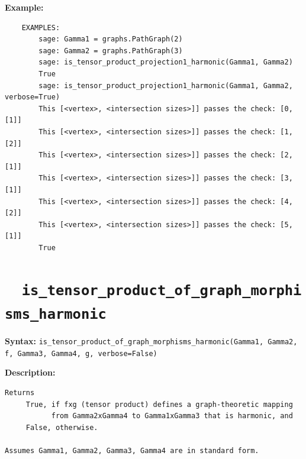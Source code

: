 \documentclass{article}
\begin{document}
\textbf{Example:}
\begin{verbatim}
    EXAMPLES:
        sage: Gamma1 = graphs.PathGraph(2)
        sage: Gamma2 = graphs.PathGraph(3)
        sage: is_tensor_product_projection1_harmonic(Gamma1, Gamma2) 
        True
        sage: is_tensor_product_projection1_harmonic(Gamma1, Gamma2, verbose=True) 
        This [<vertex>, <intersection sizes>]] passes the check: [0, [1]]
        This [<vertex>, <intersection sizes>]] passes the check: [1, [2]]
        This [<vertex>, <intersection sizes>]] passes the check: [2, [1]]
        This [<vertex>, <intersection sizes>]] passes the check: [3, [1]]
        This [<vertex>, <intersection sizes>]] passes the check: [4, [2]]
        This [<vertex>, <intersection sizes>]] passes the check: [5, [1]]
        True
\end{verbatim}

\section{\tt \ \ is\_tensor\_product\_of\_graph\_morphisms\_harmonic}

\textbf{Syntax:}
{\small{
\verb}is_tensor_product_of_graph_morphisms_harmonic(Gamma1, Gamma2, f, Gamma3, Gamma4, g, verbose=False)}\\
}}

\textbf{Description:}
\begin{verbatim}
Returns
     True, if fxg (tensor product) defines a graph-theoretic mapping
           from Gamma2xGamma4 to Gamma1xGamma3 that is harmonic, and
     False, otherwise. 

Assumes Gamma1, Gamma2, Gamma3, Gamma4 are in standard form.
\end{verbatim}
\end{document}

